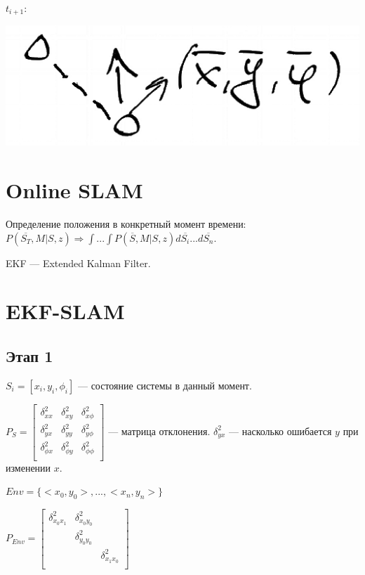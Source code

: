 \documentclass[12pt]{article}
\begin{document}
$t_{i+1}$:

\includegraphics[height=0.1\textheight]{graphics/pic03.png}

\section{Online SLAM}

Определение положения в конкретный момент времени: $P(\overline{S_T}, M|S, z) \Rightarrow \int ... \int P(\overline{S}, M|S, z) d\overline{S_i} ... d \overline{S_n}$.

EKF — Extended Kalman Filter.

\section{EKF-SLAM}
\subsection{Этап 1}

$S_i = [x_i, y_i, \phi_i]$ — состояние системы в данный момент.

$P_S = \begin{bmatrix}
        \delta_{xx}^2     & \delta_{xy}^2     & \delta_{x\phi}^2     \\
        \delta_{yx}^2     & \delta_{yy}^2     & \delta_{y\phi}^2     \\
        \delta_{\phi x}^2 & \delta_{\phi y}^2 & \delta_{\phi \phi}^2 \\
    \end{bmatrix}$ — матрица отклонения. $\delta_{yx}^2$ — насколько ошибается $y$ при изменении $x$.

$Env = \{<x_0, y_0>, ..., <x_n, y_n>\}$

$P_{Env} = \begin{bmatrix}
        \delta_{x_0x_1}^2 & \delta_{x_0y_0}^2 &                   \\
                          & \delta_{y_0y_0}^2 &                   \\
                          &                   & \delta_{x_1x_0}^2 \\
    \end{bmatrix}$
\end{document}

